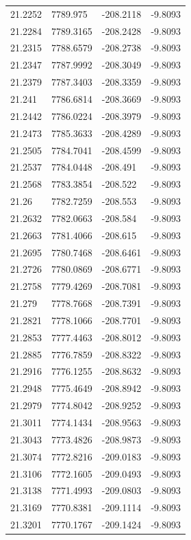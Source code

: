 \begin{table}[H]
\begin{tabular}{llll}
21.2252 & 7789.975 & -208.2118 & -9.8093 \\
21.2284 & 7789.3165 & -208.2428 & -9.8093 \\
21.2315 & 7788.6579 & -208.2738 & -9.8093 \\
21.2347 & 7787.9992 & -208.3049 & -9.8093 \\
21.2379 & 7787.3403 & -208.3359 & -9.8093 \\
21.241 & 7786.6814 & -208.3669 & -9.8093 \\
21.2442 & 7786.0224 & -208.3979 & -9.8093 \\
21.2473 & 7785.3633 & -208.4289 & -9.8093 \\
21.2505 & 7784.7041 & -208.4599 & -9.8093 \\
21.2537 & 7784.0448 & -208.491 & -9.8093 \\
21.2568 & 7783.3854 & -208.522 & -9.8093 \\
21.26 & 7782.7259 & -208.553 & -9.8093 \\
21.2632 & 7782.0663 & -208.584 & -9.8093 \\
21.2663 & 7781.4066 & -208.615 & -9.8093 \\
21.2695 & 7780.7468 & -208.6461 & -9.8093 \\
21.2726 & 7780.0869 & -208.6771 & -9.8093 \\
21.2758 & 7779.4269 & -208.7081 & -9.8093 \\
21.279 & 7778.7668 & -208.7391 & -9.8093 \\
21.2821 & 7778.1066 & -208.7701 & -9.8093 \\
21.2853 & 7777.4463 & -208.8012 & -9.8093 \\
21.2885 & 7776.7859 & -208.8322 & -9.8093 \\
21.2916 & 7776.1255 & -208.8632 & -9.8093 \\
21.2948 & 7775.4649 & -208.8942 & -9.8093 \\
21.2979 & 7774.8042 & -208.9252 & -9.8093 \\
21.3011 & 7774.1434 & -208.9563 & -9.8093 \\
21.3043 & 7773.4826 & -208.9873 & -9.8093 \\
21.3074 & 7772.8216 & -209.0183 & -9.8093 \\
21.3106 & 7772.1605 & -209.0493 & -9.8093 \\
21.3138 & 7771.4993 & -209.0803 & -9.8093 \\
21.3169 & 7770.8381 & -209.1114 & -9.8093 \\
21.3201 & 7770.1767 & -209.1424 & -9.8093 \\

\end{tabular}
\end{table}
